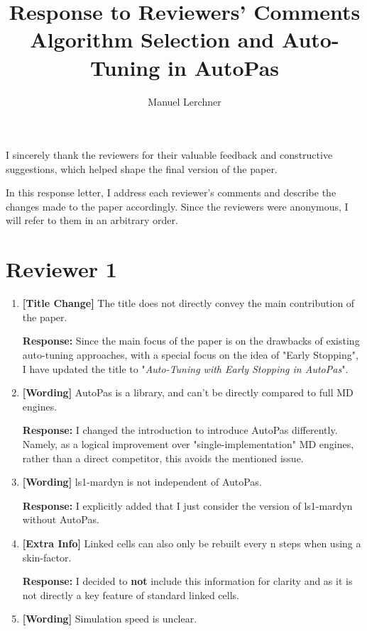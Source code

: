 \documentclass[12pt,a4paper]{article}
\title{Response to Reviewers' Comments\\Algorithm Selection and Auto-Tuning in AutoPas}
\author{Manuel Lerchner}
\date{}
\begin{document}
\maketitle

I sincerely thank the reviewers for their valuable feedback and constructive suggestions, which helped shape the final version of the paper.

In this response letter, I address each reviewer's comments and describe the changes made to the paper accordingly. Since the reviewers were anonymous, I will refer to them in an arbitrary order.


\section*{Reviewer 1}
\begin{enumerate}[label=\textbf{Comment \arabic*:}, itemsep=0.8em]
    \item \textbf{[Title Change]} The title does not directly convey the main contribution of the paper.

          \textbf{Response:}
          Since the main focus of the paper is on the drawbacks of existing auto-tuning approaches, with a special focus on the idea of "Early Stopping", I have updated the title to "\textit{Auto-Tuning with Early Stopping in AutoPas}".

    \item \textbf{[Wording]} AutoPas is a library, and can't be directly compared to full MD engines.

          \textbf{Response:} I changed the introduction to introduce AutoPas differently. Namely, as a logical improvement over "single-implementation" MD engines, rather than a direct competitor, this avoids the mentioned issue.

    \item \textbf{[Wording]} ls1-mardyn is not independent of AutoPas.

          \textbf{Response:} I explicitly added that I just consider the version of ls1-mardyn without AutoPas.

    \item \textbf{[Extra Info]} Linked cells can also only be rebuilt every n steps when using a skin-factor.

          \textbf{Response:} I decided to \textbf{not} include this information for clarity and as it is not directly a key feature of standard linked cells.

    \item \textbf{[Wording]} Simulation speed is unclear.


\end{enumerate}
\end{document}
